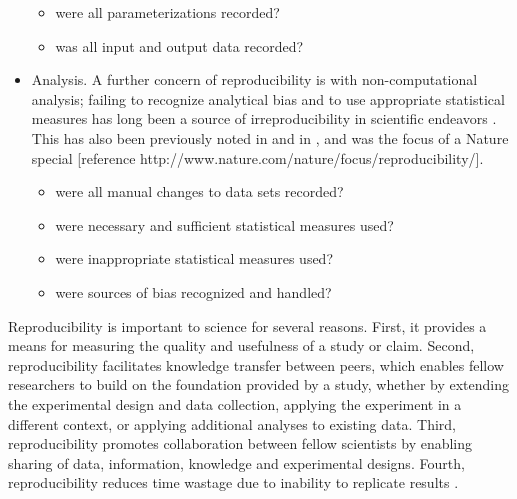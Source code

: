 \documentclass[a4paper]{report}
\begin{document}
\begin{itemize}
\begin{itemize}
     \item were all parameterizations recorded?
     \item was all input and output data recorded?
  \end{itemize}
  \item Analysis.  A further concern of reproducibility is with 
  non-computational analysis; failing to recognize analytical bias and to 
  use appropriate statistical measures has long been a source of 
  irreproducibility in scientific endeavors \cite{sackett1979bias}.
  This has also been previously noted in \cite{ioannidis2005most} 
  and in \cite{nuzzo2014statistical}, 
  and was the focus of a Nature special [reference http://www.nature.com/nature/focus/reproducibility/].
  \begin{itemize}
     \item were all manual changes to data sets recorded?
     \item were necessary and sufficient statistical measures used?
     \item were inappropriate statistical measures used?
     \item were sources of bias recognized and handled?
  \end{itemize}
\end{itemize}

Reproducibility is important to science for several reasons.  First, it 
provides a means for measuring the quality and usefulness of a study or 
claim.  Second, reproducibility facilitates knowledge transfer between 
peers, which enables fellow researchers to build on the foundation provided 
by a study, whether by extending the experimental design and data collection, 
applying the experiment in a different context, or applying additional analyses 
to existing data.  Third, reproducibility promotes collaboration between fellow 
scientists by enabling sharing of data, information, knowledge and experimental 
designs.  Fourth, reproducibility reduces time wastage due to inability to 
replicate results \cite{ioannidis2005most, mullard2011reliability}. 
\end{document}
